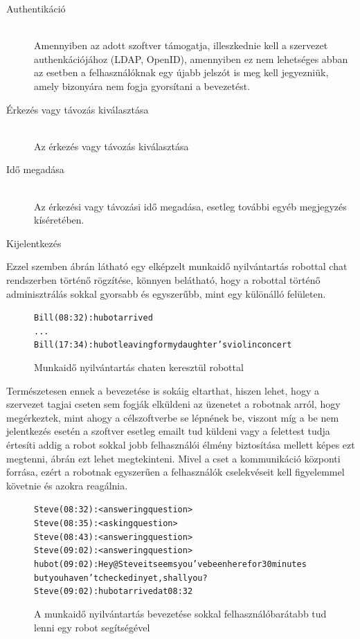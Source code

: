 \begin{description}
  \item[Authentikáció]\hfill\\
  Amennyiben az adott szoftver támogatja, illeszkednie kell a szervezet authenkációjához (LDAP, OpenID), amennyiben ez nem lehetséges abban az esetben a felhasználóknak egy újabb jelszót is meg kell jegyezniük, amely bizonyára nem fogja gyorsítani a bevezetést.
  \item[Érkezés vagy távozás kiválasztása]\hfill\\
  Az érkezés vagy távozás kiválasztása
  \item[Idő megadása]\hfill\\
  Az érkezési vagy távozási idő megadása, esetleg további egyéb megjegyzés kíséretében.
  \item[Kijelentkezés]
\end{description}

Ezzel szemben  ábrán látható egy elképzelt munkaidő nyilvántartás robottal chat rendszerben történő rögzítése, könnyen belátható, hogy a robottal történő adminisztrálás sokkal gyorsabb és egyszerűbb, mint egy különálló felületen.

\begin{figure}
  \begin{alltt}
Bill (08:32): hubot arrived
...
Bill (17:34): hubot leaving for my daughter's violin concert
  \end{alltt}
  \caption[DUMMY]%
    {Munkaidő nyilvántartás chaten keresztül robottal}%
    \label{lst:workhour_with_hubot}
\end{figure}

Természetesen ennek a bevezetése is sokáig eltarthat, hiszen lehet, hogy a szervezet tagjai cseten sem fogják elküldeni az üzenetet a robotnak arról, hogy megérkeztek, mint ahogy a célszoftverbe se lépnének be, viszont míg a be nem jelentkezés esetén a szoftver esetleg emailt tud küldeni vagy a felettest tudja értesíti addig a robot sokkal jobb felhasználói élmény biztosítása mellett képes ezt megtenni,  ábrán ezt lehet megtekinteni. Mivel a cset a kommunikáció központi forrása, ezért a robotnak egyszerűen a felhasználók cselekvéseit kell figyelemmel követnie és azokra reagálnia.

\begin{figure}
  \begin{alltt}
Steve (08:32): <answering question>
Steve (08:35): <asking question>
Steve (08:43): <answering question>
Steve (09:02): <answering question>
hubot (09:02): Hey @Steve it seems you've been here for 30 minutes
               but you haven't checked in yet, shall you?
Steve (09:02): hubot arrived at 08:32
    \end{alltt}
    \caption[DUMMY]%
    {A munkaidő nyilvántartás bevezetése sokkal felhasználóbarátabb tud lenni egy robot segítségével}%
    \label{lst:workhour_with_hubot_ux}
\end{figure}


